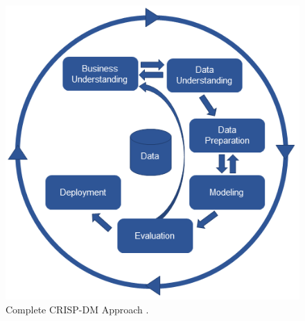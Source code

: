 \begin{figure}[H]
\centering
\includegraphics[width=0.8\linewidth]{Chapters/img/crisp_dm.png}
\caption{Complete CRISP-DM Approach  \cite{WEBSITE:CRISPDM}.  }
\label{fig:crisp_dm}
\end{figure}

